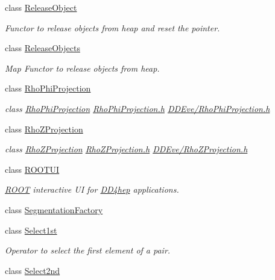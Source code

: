 \begin{DoxyCompactItemize}
class \hyperlink{class_d_d4hep_1_1_release_object}{Release\+Object}
\begin{DoxyCompactList}\small\item\em Functor to release objects from heap and reset the pointer. \end{DoxyCompactList}\item 
class \hyperlink{class_d_d4hep_1_1_release_objects}{Release\+Objects}
\begin{DoxyCompactList}\small\item\em Map Functor to release objects from heap. \end{DoxyCompactList}\item 
class \hyperlink{class_d_d4hep_1_1_rho_phi_projection}{Rho\+Phi\+Projection}
\begin{DoxyCompactList}\small\item\em class \hyperlink{class_d_d4hep_1_1_rho_phi_projection}{Rho\+Phi\+Projection} \hyperlink{_rho_phi_projection_8h}{Rho\+Phi\+Projection.\+h} \hyperlink{_rho_phi_projection_8h}{D\+D\+Eve/\+Rho\+Phi\+Projection.\+h} \end{DoxyCompactList}\item 
class \hyperlink{class_d_d4hep_1_1_rho_z_projection}{Rho\+Z\+Projection}
\begin{DoxyCompactList}\small\item\em class \hyperlink{class_d_d4hep_1_1_rho_z_projection}{Rho\+Z\+Projection} \hyperlink{_rho_z_projection_8h}{Rho\+Z\+Projection.\+h} \hyperlink{_rho_z_projection_8h}{D\+D\+Eve/\+Rho\+Z\+Projection.\+h} \end{DoxyCompactList}\item 
class \hyperlink{class_d_d4hep_1_1_r_o_o_t_u_i}{R\+O\+O\+T\+UI}
\begin{DoxyCompactList}\small\item\em \hyperlink{namespace_r_o_o_t}{R\+O\+OT} interactive UI for \hyperlink{namespace_d_d4hep}{D\+D4hep} applications. \end{DoxyCompactList}\item 
class \hyperlink{class_d_d4hep_1_1_segmentation_factory}{Segmentation\+Factory}
\item 
class \hyperlink{class_d_d4hep_1_1_select1st}{Select1st}
\begin{DoxyCompactList}\small\item\em Operator to select the first element of a pair. \end{DoxyCompactList}\item 
class \hyperlink{class_d_d4hep_1_1_select2nd}{Select2nd}

\end{DoxyCompactItemize}

